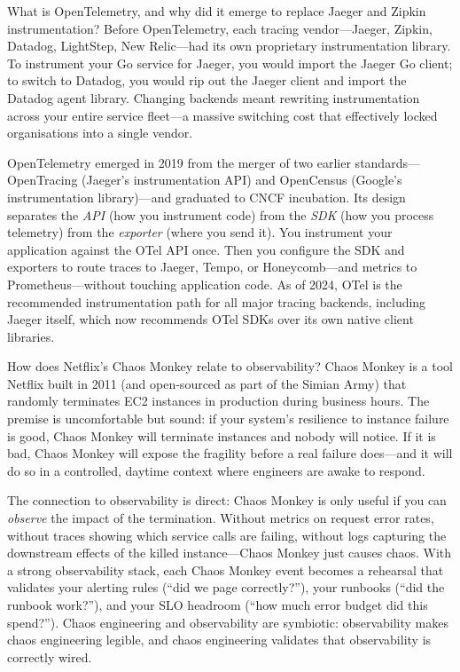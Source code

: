 \documentclass[11pt,a4paper]{article}
\begin{document}
\begin{curiobox}{What is OpenTelemetry, and why did it emerge to replace Jaeger and Zipkin instrumentation?}
  Before OpenTelemetry, each tracing vendor---Jaeger, Zipkin, Datadog, LightStep, New Relic---had its own proprietary instrumentation library. To instrument your Go service for Jaeger, you would import the Jaeger Go client; to switch to Datadog, you would rip out the Jaeger client and import the Datadog agent library. Changing backends meant rewriting instrumentation across your entire service fleet---a massive switching cost that effectively locked organisations into a single vendor.

  OpenTelemetry emerged in 2019 from the merger of two earlier standards---OpenTracing (Jaeger's instrumentation API) and OpenCensus (Google's instrumentation library)---and graduated to CNCF incubation. Its design separates the \emph{API} (how you instrument code) from the \emph{SDK} (how you process telemetry) from the \emph{exporter} (where you send it). You instrument your application against the OTel API once. Then you configure the SDK and exporters to route traces to Jaeger, Tempo, or Honeycomb---and metrics to Prometheus---without touching application code. As of 2024, OTel is the recommended instrumentation path for all major tracing backends, including Jaeger itself, which now recommends OTel SDKs over its own native client libraries.
\end{curiobox}

\begin{curiobox}{How does Netflix's Chaos Monkey relate to observability?}
  Chaos Monkey is a tool Netflix built in 2011 (and open-sourced as part of the Simian Army) that randomly terminates EC2 instances in production during business hours. The premise is uncomfortable but sound: if your system's resilience to instance failure is good, Chaos Monkey will terminate instances and nobody will notice. If it is bad, Chaos Monkey will expose the fragility before a real failure does---and it will do so in a controlled, daytime context where engineers are awake to respond.

  The connection to observability is direct: Chaos Monkey is only useful if you can \emph{observe} the impact of the termination. Without metrics on request error rates, without traces showing which service calls are failing, without logs capturing the downstream effects of the killed instance---Chaos Monkey just causes chaos. With a strong observability stack, each Chaos Monkey event becomes a rehearsal that validates your alerting rules (``did we page correctly?''), your runbooks (``did the runbook work?''), and your SLO headroom (``how much error budget did this spend?''). Chaos engineering and observability are symbiotic: observability makes chaos engineering legible, and chaos engineering validates that observability is correctly wired.
\end{curiobox}
\end{document}
